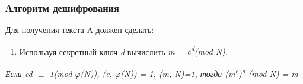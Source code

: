   \subsubsection{Алгоритм дешифрования}
  Для получения текста A должен сделать:
    
    \begin{enumerate}
     \item Используя секретный ключ \textit{d} вычислить \textit{m = c\textsuperscript{d}(mod N)}.
    \end{enumerate}  
    
  \begin{theorem}
    \textit{Если ed {$\equiv$} 1(mod {$\varphi$}(N)), (e, {$\varphi$}(N)) = 1, (m, N)=1, тогда (m\textsuperscript{e})\textsuperscript{d} (mod N) = m}
  \end{theorem}

